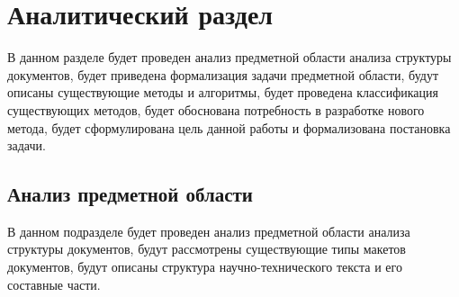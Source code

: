 \section{Аналитический раздел}

В данном разделе будет проведен анализ предметной области анализа структуры документов, будет приведена формализация задачи предметной области, будут описаны существующие методы и алгоритмы, будет проведена классификация существующих методов, будет обоснована потребность в разработке нового метода, будет сформулирована цель данной работы и формализована постановка задачи.




\subsection{Анализ предметной области}

В данном подразделе будет проведен анализ предметной области анализа структуры документов, будут рассмотрены существующие типы макетов документов, будут описаны структура научно-технического текста и его составные части.


